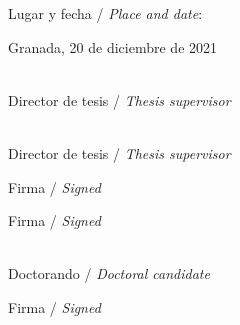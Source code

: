 Lugar y fecha / \textit{Place and date}:

Granada, 20 de diciembre de 2021


\noindent\small

\begin{minipage}[t]{.5\textwidth}
\centering
\textbf{\thesisFirstSupervisor}\\
Director de tesis / \textit{Thesis supervisor}
\end{minipage}
\begin{minipage}[t]{.5\textwidth}
\centering
\textbf{\thesisSecondSupervisor}\\
Director de tesis / \textit{Thesis supervisor}
\end{minipage}

\noindent\small
\begin{minipage}[c]{.5\textwidth}
	\centering
	Firma / \textit{Signed}
\end{minipage}
\noindent
\begin{minipage}[c]{.5\textwidth}
	\centering
	Firma / \textit{Signed}
\end{minipage}

\noindent
\begin{center}
	\begin{minipage}[c]{.45\textwidth}
		\centering
		\textbf{\thesisName}\\
		Doctorando / \textit{Doctoral candidate}
	\end{minipage}
\end{center}

\noindent
\begin{center}
	\begin{minipage}[c]{.45\textwidth}
		\centering
	Firma / \textit{Signed}
	\end{minipage}
\end{center}
\endinput
